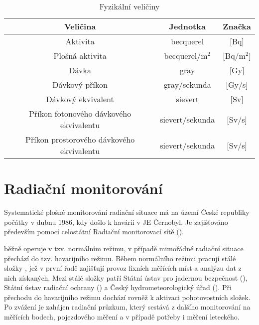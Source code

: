 \begin{itemize}
		\begin{table}[h!]
			\centering
			\caption{Fyzikální veličiny}
			\label{tab:tab_veliciny}
			\begin{tabular}{|c|c|c|}
				\hline
				\textbf{Veličina}           			& \textbf{Jednotka}  & \textbf{Značka}  \\ \hline
				Aktivita								& becquerel			 & {[}Bq{]}			\\ \hline
				Plošná aktivita							& becquerel/m$^2$	 & {[}Bq/m$^2${]}	\\ \hline
				Dávka                      	 			& gray               & {[}Gy{]}         \\ \hline
				Dávkový příkon              			& gray/sekunda		 & {[}Gy/s{]}       \\ \hline
				Dávkový ekvivalent          			& sievert            & {[}Sv{]}         \\ \hline
				Příkon fotonového dávkového ekvivalentu & sievert/sekunda	 & {[}Sv/s{]}       \\ \hline
				Příkon prostorového dávkového ekvivalentu & sievert/sekunda	 & {[}Sv/s{]}       \\ \hline
			\end{tabular}
		\end{table}
\end{itemize}

\section{Radiační monitorování}
Systematické plošné monitorování radiační situace má na území České republiky počátky v dubnu 1986, kdy došlo k havárii v JE Černobyl. Je zajišťováno především pomocí celostátní Radiační monitorovací sítě (). 

 běžně operuje v tzv. normálním režimu, v případě mimořádné radiační situace přechází do tzv. havarijního režimu. Během normálního režimu pracují stálé složky , jež v první řadě zajišťují provoz fixních měřících míst a analýzu dat z nich získaných. Mezi stálé složky  patří Státní ústav pro jadernou bezpečnost (), Státní ústav radiační ochrany () a Český hydrometeorologický úřad (). Při přechodu do havarijního režimu dochází rovněž k aktivaci pohotovostních složek. Po zvážení je zahájen radiační průzkum, který sestává z dalšího monitorování na měřících bodech, pojezdového měření a v případě potřeby i měření leteckého.


